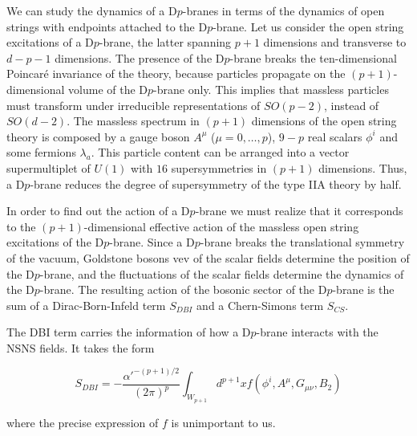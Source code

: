 We can study the dynamics of a D$p$-branes in terms of the dynamics of open strings with endpoints
attached to the D$p$-brane.
Let us consider the open string excitations of a D$p$-brane, the latter spanning $p+1$ dimensions and transverse to $d-p-1$ dimensions.
The presence of the D$p$-brane breaks the ten-dimensional Poincaré invariance of the theory, because
particles propagate on the $(p+1)$-dimensional volume of the D$p$-brane only.
This implies that massless particles must transform under irreducible representations of $SO(p-2)$, instead of
$SO(d-2)$.
The massless spectrum in $(p+1)$ dimensions of the open string theory is composed by a gauge boson $A^\mu$ ($\mu=0,\ldots,p$),
$9-p$ real scalars $\phi^i$ and some fermions $\lambda_a$.
This particle content can be arranged into a vector supermultiplet of $U(1)$ with $16$ supersymmetries
in $(p+1)$ dimensions. 
Thus, a D$p$-brane reduces the degree of supersymmetry of the type IIA theory by half.


In order to find out the action of a D$p$-brane we must realize that it corresponds to the
$(p+1)$-dimensional effective action of the massless open string excitations of the D$p$-brane.
Since a D$p$-brane breaks the translational symmetry of the vacuum, Goldstone bosons
vev of the scalar fields determine the position of the D$p$-brane, and the fluctuations of the scalar
fields determine the dynamics of the D$p$-brane.
The resulting action of the bosonic sector of the D$p$-brane is the sum of a Dirac-Born-Infeld term $S_{DBI}$ and a Chern-Simons term $S_{CS}$.

The DBI term carries the information of how a D$p$-brane interacts with the NSNS fields. 
It takes the form

\begin{equation}
  S_{DBI}= -\frac{\alpha'^{-(p+1)/2}}{(2\pi)^p}\int_{W_{p+1}}  d^{p+1}x f(\phi^i, A^\mu, G_{\mu\nu}, B_2)
\end{equation}

where the precise expression of $f$ is unimportant to us.



%
%
%

